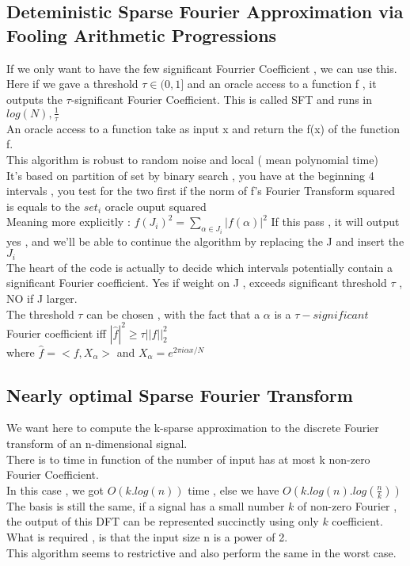 \documentclass{article}
\begin{document}
\subsection{Deteministic Sparse Fourier Approximation via Fooling Arithmetic Progressions}
If we only want to have the few significant Fourrier Coefficient , we can use this.\\
Here if we gave a threshold $\tau \in (0,1]$ and an oracle access to a function f , it outputs the $\tau$-significant Fourier Coefficient. This is called SFT and runs in $log(N) ,\frac{1}{\tau}$\\
An oracle access to a function take as input x and return the f(x) of the function f.\\
This algorithm is robust to random noise and local ( mean polynomial time)\\
It's based on partition of set by binary search , you have at the beginning 4 intervals , you test for the two first if the norm of f's Fourier Transform squared is equals to the $set_i$ oracle ouput squared\\
Meaning more explicitly : $f(J_i)^2 = \sum_{\alpha \in J_i}{|f(\alpha)|^2}$ If this pass , it will output yes , and we'll be able to continue the algorithm by replacing the J and insert the $J_i$\\
The heart of the code is actually to decide which intervals potentially contain a significant Fourier coefficient. Yes if weight on J , exceeds significant threshold $\tau$ , NO if J larger.\\
The threshold $\tau$ can be chosen , with the fact that a $\alpha$ is a $\tau -significant$ Fourier coefficient iff $|\hat{f}|^2 \geq \tau||f||^{2}_2$\\ where $\hat{f} = <f,X_{\alpha}>$ and $X_{\alpha} = e^{2\pi i \alpha x/N}$

\subsection{Nearly optimal Sparse Fourier Transform}
We want here to compute the k-sparse approximation to the discrete Fourier transform of an n-dimensional signal.\\
There is to time in function of the number of input has at most k non-zero Fourier Coefficient.\\
In this case , we got $O(k.log(n))$ time , else we have $O(k.log(n).log(\frac{n}{k}))$\\
The basis is still the same, if a signal has a small number $k$ of non-zero Fourier , the output of this DFT can be represented succinctly using only $k$ coefficient.\\
What is required , is that the input size n is a power of 2.\\
This algorithm seems to restrictive and also perform the same in the worst case.\\
\end{document}
